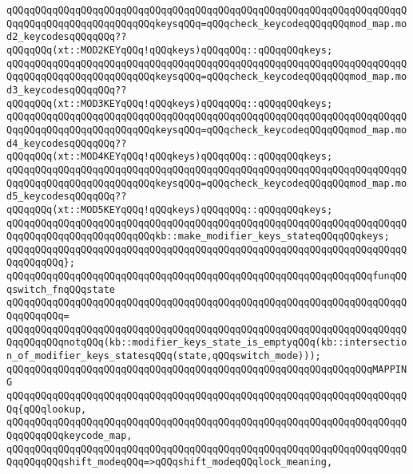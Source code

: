 \verb|qQQqqQQqqQQqqQQqqQQqqQQqqQQqqQQqqQQqqQQqqQQqqQQqqQQqqQQqqQQqqQQqqQQqqQQqqQQqqQQqqQQqqQQqqQQqqQQqkeysqQQq=qQQqcheck_keycodeqQQqqQQqmod_map.mod2_keycodesqQQqqQQq??qQQqqQQq(xt::MOD2KEYqQQq!qQQqkeys)qQQqqQQq::qQQqqQQqkeys;|\newline
\verb|qQQqqQQqqQQqqQQqqQQqqQQqqQQqqQQqqQQqqQQqqQQqqQQqqQQqqQQqqQQqqQQqqQQqqQQqqQQqqQQqqQQqqQQqqQQqqQQqkeysqQQq=qQQqcheck_keycodeqQQqqQQqmod_map.mod3_keycodesqQQqqQQq??qQQqqQQq(xt::MOD3KEYqQQq!qQQqkeys)qQQqqQQq::qQQqqQQqkeys;|\newline
\verb|qQQqqQQqqQQqqQQqqQQqqQQqqQQqqQQqqQQqqQQqqQQqqQQqqQQqqQQqqQQqqQQqqQQqqQQqqQQqqQQqqQQqqQQqqQQqqQQqkeysqQQq=qQQqcheck_keycodeqQQqqQQqmod_map.mod4_keycodesqQQqqQQq??qQQqqQQq(xt::MOD4KEYqQQq!qQQqkeys)qQQqqQQq::qQQqqQQqkeys;|\newline
\verb|qQQqqQQqqQQqqQQqqQQqqQQqqQQqqQQqqQQqqQQqqQQqqQQqqQQqqQQqqQQqqQQqqQQqqQQqqQQqqQQqqQQqqQQqqQQqqQQqkeysqQQq=qQQqcheck_keycodeqQQqqQQqmod_map.mod5_keycodesqQQqqQQq??qQQqqQQq(xt::MOD5KEYqQQq!qQQqkeys)qQQqqQQq::qQQqqQQqkeys;|\newline
\newline
\verb|qQQqqQQqqQQqqQQqqQQqqQQqqQQqqQQqqQQqqQQqqQQqqQQqqQQqqQQqqQQqqQQqqQQqqQQqqQQqqQQqqQQqqQQqqQQqqQQqkb::make_modifier_keys_stateqQQqqQQqkeys;|\newline
\verb|qQQqqQQqqQQqqQQqqQQqqQQqqQQqqQQqqQQqqQQqqQQqqQQqqQQqqQQqqQQqqQQqqQQqqQQqqQQqqQQq};|\newline
\newline
\verb|qQQqqQQqqQQqqQQqqQQqqQQqqQQqqQQqqQQqqQQqqQQqqQQqqQQqqQQqqQQqqQQqfunqQQqswitch_fnqQQqstate|\newline
\verb|qQQqqQQqqQQqqQQqqQQqqQQqqQQqqQQqqQQqqQQqqQQqqQQqqQQqqQQqqQQqqQQqqQQqqQQqqQQqqQQq=|\newline
\verb|qQQqqQQqqQQqqQQqqQQqqQQqqQQqqQQqqQQqqQQqqQQqqQQqqQQqqQQqqQQqqQQqqQQqqQQqqQQqqQQqnotqQQq(kb::modifier_keys_state_is_emptyqQQq(kb::intersection_of_modifier_keys_statesqQQq(state,qQQqswitch_mode)));|\newline
\newline
\verb|qQQqqQQqqQQqqQQqqQQqqQQqqQQqqQQqqQQqqQQqqQQqqQQqqQQqqQQqqQQqqQQqMAPPING|\newline
\verb|qQQqqQQqqQQqqQQqqQQqqQQqqQQqqQQqqQQqqQQqqQQqqQQqqQQqqQQqqQQqqQQqqQQqqQQq{qQQqlookup,|\newline
\verb|qQQqqQQqqQQqqQQqqQQqqQQqqQQqqQQqqQQqqQQqqQQqqQQqqQQqqQQqqQQqqQQqqQQqqQQqqQQqqQQqkeycode_map,|\newline
\verb|qQQqqQQqqQQqqQQqqQQqqQQqqQQqqQQqqQQqqQQqqQQqqQQqqQQqqQQqqQQqqQQqqQQqqQQqqQQqqQQqshift_modeqQQq=>qQQqshift_modeqQQqlock_meaning,|\newline
